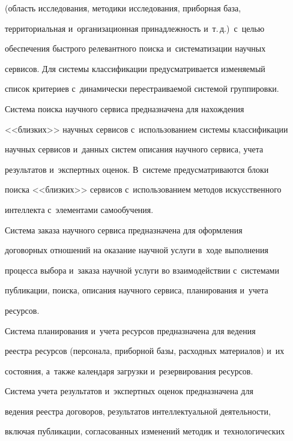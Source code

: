 (область исследования, методики исследования, приборная база, 


территориальная и~организационная принадлежность и~т.\,д.)\ с~целью 


обеспечения быстрого релевантного поиска и~систематизации научных 


сервисов. Для системы классификации предусматривается изменяемый 


список критериев с~динамически перестраиваемой системой группировки.


     


     Система поиска научного сервиса предназначена для нахождения 


<<близких>> научных сервисов с~использованием системы классификации 


научных сервисов и~данных систем описания научного сервиса, учета 


результатов и~экспертных оценок. В~системе предусматриваются блоки 


поиска <<близких>> сервисов с~использованием методов искусственного 


интеллекта с~элементами самообучения.


     


     Система заказа научного сервиса предназначена для оформления 


договорных отношений на оказание научной услуги в~ходе выполнения 


процесса выбора и~заказа научной услуги во взаимодействии с~системами 


публикации, поиска, описания научного сервиса, планирования и~учета 


ресурсов.


     


     Система планирования и~учета ресурсов предназначена для ведения 


реестра ресурсов (персонала, приборной базы, расходных материалов) и~их 


состояния, а~так\-же календаря загрузки и~резервирования ресурсов.


     


     Система учета результатов и~экспертных оценок предназначена для 


ведения реестра договоров, результатов интеллектуальной деятельности, 


включая публикации, согласованных изменений методик и~технологических 



